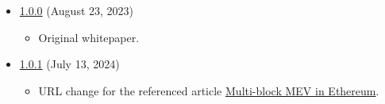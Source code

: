 \documentclass[tikz]{article}
\begin{document}
\begin{itemize}[topsep=0pt, itemsep=3pt,leftmargin=16pt]
    \item \href{https://github.com/BeanstalkFarms/Basin-Whitepaper/blob/main/version-history/basin1_0_0.pdf}{1.0.0} (August 23, 2023)
    
    \begin{itemize}
        \item Original whitepaper.
    \end{itemize}
    
    \item \href{https://github.com/BeanstalkFarms/Basin-Whitepaper/blob/main/version-history/basin1_0_1.pdf}{1.0.1} (July 13, 2024)
    
    \begin{itemize}
        \item URL change for the referenced article \href{https://www.alvarorevuelta.com/posts/ethereum-mev-multiblock}{Multi-block MEV in Ethereum}.
    \end{itemize}
\end{itemize}
\end{document}
